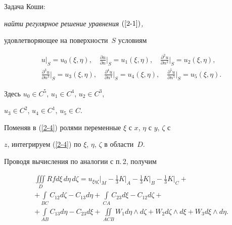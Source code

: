 Задача Коши: {\it найти регулярное решение уравнения $(\ref{2-1})$,


удовлетворяющее на поверхности~$S$ условиям}


\begin{gather*}


u\big\vert_{S}=u_{0}(\xi,\eta),\quad


\frac{\partial u}{\partial n}\Big\vert_{S}=u_{1}(\xi,\eta),\quad


\frac{\partial^2 u}{\partial n^2}\Big\vert_{S}=u_{2}(\xi,\eta),\\


%


\frac{\partial^3 u}{\partial n^3}\Big\vert_{S}


=u_{3}(\xi,\eta), \quad


\frac{\partial^4 u}{\partial n^4}\Big\vert_{S}


=u_{4}(\xi,\eta),\quad


\frac{\partial^5 u}{\partial n^5}\Big\vert_{S}


=u_{5}(\xi,\eta).


\end{gather*}


Здесь $u_{0}\in C^{5}$, $u_{1}\in C^{4}$, $u_{2}\in C^{3}$,


$u_{3}\in C^{2}$, $u_{4}\in C^{1}$, $u_{5}\in C$.





Поменяв в (\ref{2-4}) ролями переменные $\xi$ с $x$, $\eta$ с $y$, $\zeta$ с


$z$, интегрируем (\ref{2-4}) по $\xi$, $\eta$, $\zeta$ в области~$D$.


Проводя вычисления по аналогии с п.\,2, получим


\begin{multline}\label{2-6}


\iiint\limits_{D} Rf d\xi\, d\eta\, d\zeta=


u_{\xi\eta\zeta}\big\vert_{M}-\frac{1}{3}K\big\vert_{A}


-\frac{1}{3}K\big\vert_{B}


-\frac{1}{3}K\big\vert_{C}+\\


%


+\int\limits_{BC} C_{12} d\zeta - C_{13} d\eta


+\int\limits_{CA} C_{23} d\xi - C_{12} d\zeta + \\


%


+\int\limits_{AB} C_{13} d\eta - C_{23} d\xi


+\iint\limits_{ACB}  W_1 d\eta\wedge d\zeta


+W_2 d\zeta \wedge d\xi + W_3 d\xi \wedge d\eta.


\end{multline}


